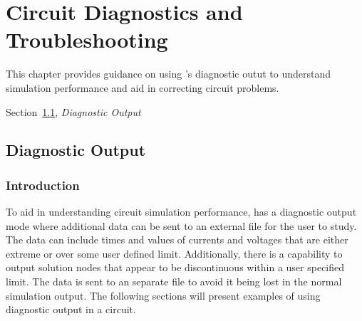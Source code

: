 

\chapter{Circuit Diagnostics and Troubleshooting}
\label{Parallel}

{
This chapter provides guidance on using \Xyce{}'s diagnostic outut 
to understand simulation performance and aid in correcting
circuit problems.
\begin{XyceItemize}
\item Section~\ref{DiagnosticOutput}, {\em Diagnostic Output}
\end{XyceItemize}
}

\section{Diagnostic Output}
\label{DiagnosticOutput}

\subsection{Introduction}
To aid in understanding circuit simulation performance, \Xyce{} has a diagnostic output mode
where additional data can be sent to an external file for the user to study.  The data 
can include times and values of currents and voltages that are either extreme or over some
user defined limit.  Additionally, there is a capability to output solution nodes that 
appear to be discontinuous within a user specified limit.  The data is sent to an separate
file to avoid it being lost in the normal simulation output.  The following sections will
present examples of using diagnostic output in a circuit.


